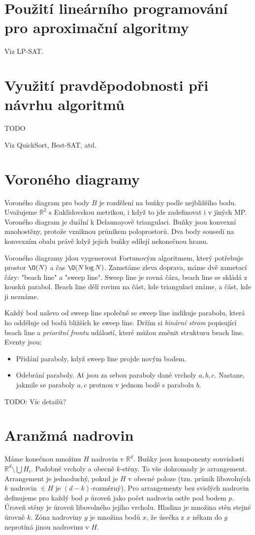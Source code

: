 \documentclass[a4paper,10pt,titlepage]{article} \usepackage[utf8]{inputenc}
\def\R{\mathbb{R}}
\begin{document}
\section{Použití lineárního programování pro aproximační algoritmy}
Viz LP-SAT.

\section{Využití pravděpodobnosti při návrhu algoritmů}
TODO

Viz QuickSort, Best-SAT, atd.

\section{Voroného diagramy}
Voroného diagram pro body $B$ je rozdělení na buňky podle nejbližšího
bodu. Uvažujeme $\R^2$ s Euklidovskou metrikou, i když to jde zadefinovat
i v jiných MP.
Voroného diagram je duální k Delaunayově triangulaci.
Buňky jsou konvexní mnohostěny, protože vzniknou průnikem poloprostorů.
Dva body sousedí na konvexním obalu právě když jejich buňky sdílejí nekonečnou
hranu.

Voroného diagramy jdou vygenerovat Fortunovým algoritmem, který potřebuje
prostor $\O(N)$ a čas $\O(N\log N)$. Zametáme zleva
doprava, máme dvě zametací čáry: "beach line" a "sweep line".
Sweep line je rovná čára, beach line se skládá z kousků parabol.
Beach line dělí rovinu na část, kde triangulaci známe, a část, kde ji neznáme.

Každý bod nalevo od sweep line společně se sweep line indikuje parabolu,
která ho odděluje od bodů bližších ke sweep line.
Držím si \emph{binární strom} popisující beach line a \emph{prioritní frontu}
událostí, které můžou změnit strukturu beach line.
Eventy jsou:
\begin{itemize}
\item Přidání paraboly, když sweep line projde novým bodem.
\item Odebrání paraboly. Ať jsou za sebou paraboly dané vrcholy $a,b,c$.
Nastane, jakmile se paraboly $a,c$ protnou v jednom bodě s parabolu $b$.
\end{itemize}

TODO: Víc detailů?

\section{Aranžmá nadrovin}
Máme konečnou množinu $H$ nadrovin v $\R^d$. Buňky jsou komponenty souvislosti
$\R^d \setminus \bigcup H_i$. Podobně vrcholy a obecně $k$-stěny. To vše dohromady
je arrangement. Arrangement je jednoduchý, pokud je $H$ v obecné poloze (tzn. průnik
libovolných $k$ nadrovin $\in H$ je $(d-k)$-rozměrný). Pro arrangementy bez svislých
nadrovin definujeme pro každý bod $p$ úroveň jako počet nadrovin ostře pod bodem $p$.
Úroveň stěny je úroveň libovolného jejího vrcholu. Hladina je množina stěn stejné
úrovně $k$. Zóna nadroviny $g$ je množina bodů $x$, že úsečka z $x$ někam do $g$
neprotíná jinou nadrovinu v $H$.
\end{document}

